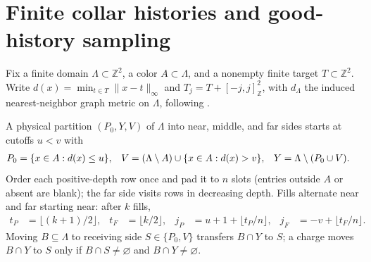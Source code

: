 \section{Finite collar histories and good-history sampling}
\label{sec:al_finite_scan_histories}

Fix a finite domain $\Lambda\subset\mathbb Z^2$, a color $A\subset\Lambda$,
and a nonempty finite target $T\subset\mathbb Z^2$. Write
$d(x)=\min_{t\in T}\|x-t\|_\infty$ and $T_j=T+[-j,j]^2_{\mathbb Z}$, with
$d_\Lambda$ the induced nearest-neighbor graph metric on $\Lambda$, following
\cite[Section~9, moving partitions]{OpenAI2026AreaLaw}.

\begin{definition}
    \label{def:al_scan_physical_partition}
    \leanok
    A physical partition $(P_0,Y,V)$ of $\Lambda$ into near, middle, and far
    sides starts at cutoffs $u<v$ with
    \begin{align}
        P_0 & =\{x\in A:d(x)\le u\},                      &
        V   & =(\Lambda\setminus A)\cup\{x\in A:d(x)>v\}, &
        Y   & =\Lambda\setminus(P_0\cup V). \notag
    \end{align}
    Order each positive-depth row once and pad it to $n$ slots (entries outside
    $A$ or absent are blank); the far side visits rows in decreasing depth.
    Fills alternate near and far starting near: after $k$ fills,
    \begin{align}
        t_P & =\lfloor(k+1)/2\rfloor,    &
        t_F & =\lfloor k/2\rfloor,       &
        j_P & =u+1+\lfloor t_P/n\rfloor, &
        j_F & =-v+\lfloor t_F/n\rfloor.
        \label{eq:al_scan_nominal_fronts}
    \end{align}
    Moving $B\subseteq\Lambda$ to receiving side $S\in\{P_0,V\}$ transfers
    $B\cap Y$ to $S$; a charge moves $B\cap Y$ to $S$ only if $B\cap S\ne\varnothing$
    and $B\cap Y\ne\varnothing$.
\end{definition}

